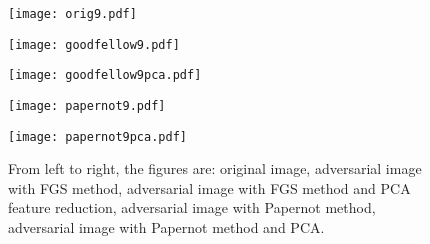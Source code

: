 \begin{figure}
\centering
\begin{minipage}{.09\textwidth}
	\centering
    \texttt{[image: orig9.pdf]}
\end{minipage}%
\begin{minipage}{.09\textwidth}
	\centering
\texttt{[image: goodfellow9.pdf]}
\end{minipage}
\begin{minipage}{.09\textwidth}
	\centering
    \texttt{[image: goodfellow9pca.pdf]}
\end{minipage}
\begin{minipage}{.09\textwidth}
	\centering
    \texttt{[image: papernot9.pdf]}
\end{minipage}
\begin{minipage}{.09\textwidth}
	\centering
    \texttt{[image: papernot9pca.pdf]}
\end{minipage}
\caption{From left to right, the figures are: original image, adversarial image with FGS method, adversarial image with FGS method and PCA feature reduction, adversarial image with Papernot method, adversarial image with Papernot method and PCA.}\label{fig:picof9s}
\end{figure}